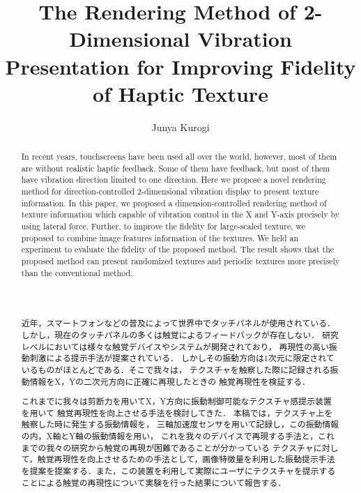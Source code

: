 

\Synopsis

\begin{Abstract}

近年，スマートフォンなどの普及によって世界中でタッチパネルが使用されている．
しかし，現在のタッチパネルの多くは触覚によるフィードバックが存在しない．
研究レベルにおいては様々な触覚デバイスやシステムが開発されており，
再現性の高い振動刺激による提示手法が提案されている．
しかしその振動方向は1次元に限定されているものがほとんどである．そこで我々は，
テクスチャを触察した際に記録される振動情報をX，Yの二次元方向に正確に再現したときの
触覚再現性を検証する．\par
これまでに我々は剪断力を用いてX，Y方向に振動制御可能なテクスチャ感提示装置を用いて
触覚再現性を向上させる手法を検討してきた．
本稿では，テクスチャ上を触察した時に発生する振動情報を，
三軸加速度センサを用いて記録し，この振動情報の内，X軸とY軸の振動情報を用い，
これを我々のデバイスで再現する手法と，これまでの我々の研究から触覚の再現が困難であることが分かっている
テクスチャに対して，触覚再現性を向上させるための手法として，画像特徴量を利用した振動提示手法を提案を提案する．また，この装置を利用して実際にユーザにテクスチャを提示することによる触覚の再現性について実験を行った結果について報告する．


\end{Abstract}

%
%
\title{The Rendering Method of 2-Dimensional Vibration Presentation
for Improving Fidelity of Haptic Texture}
\author{Junya Kurogi}

\synopsis

\begin{abstract}
In recent years, touchscreens have been used all over the world, however, most of them are without realistic haptic feedback. Some of them have feedback, but most of them have vibration direction limited to one direction. Here we propose a novel rendering method for direction-controlled 2-dimensional vibration display to present texture information. In this paper, we proposed a dimension-controlled rendering method of texture information which capable of vibration control in the X and Y-axis precisely by using lateral force. Further, to improve the fidelity for large-scaled texture, we proposed to combine image features information of the textures. We held an experiment to evaluate the fidelity of the proposed method. The result shows that the proposed method can present randomized textures and periodic textures more precisely than the conventional method.
\end{abstract}










